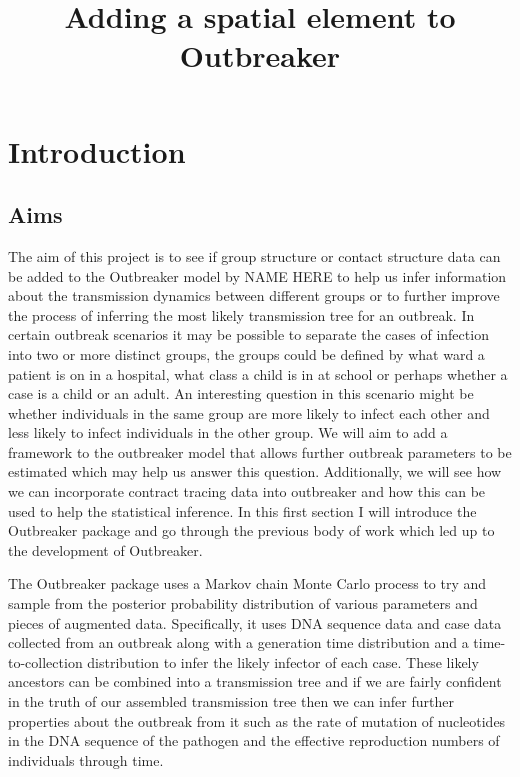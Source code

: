 \documentclass{amsbook}
\title{Adding a spatial element to Outbreaker}
\begin{document}
\maketitle

\chapter{Introduction}
\section{Aims}
The aim of this project is to see if group structure or contact structure data can be added to the Outbreaker model by NAME HERE to help us infer information about the transmission dynamics between different groups or to further improve the process of inferring the most likely transmission tree for an outbreak. In certain outbreak scenarios it may be possible to separate the cases of infection into two or more distinct groups, the groups could be defined by what ward a patient is on in a hospital, what class a child is in at school or perhaps whether a case is a child or an adult. An interesting question in this scenario might be whether individuals in the same group are more likely to infect each other and less likely to infect individuals in the other group. We will aim to add a framework to the outbreaker model that allows further outbreak parameters to be estimated which may help us answer this question. Additionally, we will see how we can incorporate contract tracing data into outbreaker and how this can be used to help the statistical inference. In this first section I will introduce the Outbreaker package and go through the previous body of work which led up to the development of Outbreaker.

The Outbreaker package uses a Markov chain Monte Carlo process to try and sample from the posterior probability distribution of various parameters and pieces of augmented data. Specifically, it uses DNA sequence data and case data collected from an outbreak along with a generation time distribution and a time-to-collection distribution to infer the likely infector of each case. These likely ancestors can be combined into a transmission tree and if we are fairly confident in the truth of our assembled transmission tree then we can infer further properties about the outbreak from it such as the rate of mutation of nucleotides in the DNA sequence of the pathogen and the effective reproduction numbers of individuals through time.
\end{document}
